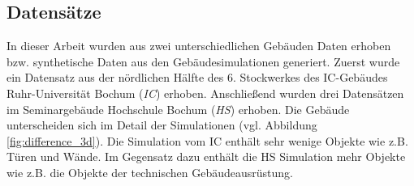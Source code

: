 \subsection{Datensätze}
\label{subsec:datasets}
In dieser Arbeit wurden aus zwei unterschiedlichen Gebäuden Daten erhoben bzw. synthetische Daten aus den Gebäudesimulationen generiert. 
Zuerst wurde ein Datensatz aus der nördlichen Hälfte des 6. Stockwerkes des IC-Gebäudes Ruhr-Universität Bochum (\textit{IC}) erhoben. Anschließend wurden drei Datensätzen im Seminargebäude Hochschule Bochum (\textit{HS}) erhoben. Die Gebäude unterscheiden sich im Detail der Simulationen (vgl.  Abbildung \ref{fig:difference_3d}). Die Simulation vom IC enthält sehr wenige Objekte wie z.B. Türen und Wände. Im Gegensatz dazu enthält die HS Simulation mehr Objekte wie z.B. die Objekte der technischen Gebäudeausrüstung.


